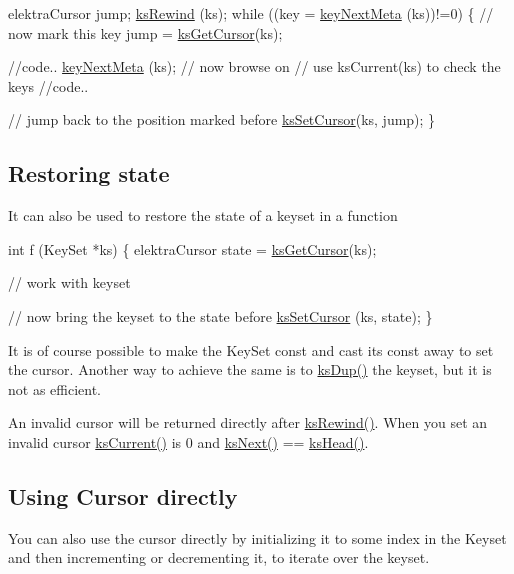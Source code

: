 \begin{DoxyCode}
elektraCursor jump;
\hyperlink{group__keyset_gabe793ff51f1728e3429c84a8a9086b70}{ksRewind} (ks);
\textcolor{keywordflow}{while} ((key = \hyperlink{group__keymeta_ga4c88342f580a4291455a801af71ce048}{keyNextMeta} (ks))!=0)
\{
        \textcolor{comment}{// now mark this key}
        jump = \hyperlink{group__keyset_gace0444eb8ec958a429794f8586fc72e7}{ksGetCursor}(ks);

        \textcolor{comment}{//code..}
        \hyperlink{group__keymeta_ga4c88342f580a4291455a801af71ce048}{keyNextMeta} (ks); \textcolor{comment}{// now browse on}
        \textcolor{comment}{// use ksCurrent(ks) to check the keys}
        \textcolor{comment}{//code..}

        \textcolor{comment}{// jump back to the position marked before}
        \hyperlink{group__keyset_ga28b2a7d13c620b3c9d4815a0608c738f}{ksSetCursor}(ks, jump);
\}
\end{DoxyCode}
\hypertarget{group__keyset_restore}{}\subsection{Restoring state}\label{group__keyset_restore}
It can also be used to restore the state of a keyset in a function


\begin{DoxyCode}
\textcolor{keywordtype}{int} f (KeySet *ks)
\{
        elektraCursor state = \hyperlink{group__keyset_gace0444eb8ec958a429794f8586fc72e7}{ksGetCursor}(ks);

        \textcolor{comment}{// work with keyset}

        \textcolor{comment}{// now bring the keyset to the state before}
        \hyperlink{group__keyset_ga28b2a7d13c620b3c9d4815a0608c738f}{ksSetCursor} (ks, state);
\}
\end{DoxyCode}


It is of course possible to make the Key\+Set const and cast its const away to set the cursor. Another way to achieve the same is to \hyperlink{group__keyset_gac59e4b328245463f1451f68d5106151c}{ks\+Dup()} the keyset, but it is not as efficient.

An invalid cursor will be returned directly after \hyperlink{group__keyset_gabe793ff51f1728e3429c84a8a9086b70}{ks\+Rewind()}. When you set an invalid cursor \hyperlink{group__keyset_ga4287b9416912c5f2ab9c195cb74fb094}{ks\+Current()} is 0 and \hyperlink{group__keyset_ga317321c9065b5a4b3e33fe1c399bcec9}{ks\+Next()} == \hyperlink{group__keyset_gae7dbf3aef70e67b5328475eb3d1f92f5}{ks\+Head()}.\hypertarget{group__keyset_cursor_directly}{}\subsection{Using Cursor directly}\label{group__keyset_cursor_directly}
You can also use the cursor directly by initializing it to some index in the Keyset and then incrementing or decrementing it, to iterate over the keyset.


